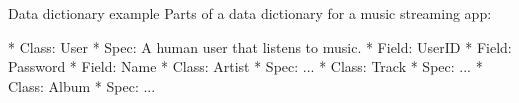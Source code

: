\begin{Slide}{Data dictionary example}
Parts of a data dictionary for a music streaming app:
\begin{Code}[language=]
* Class: User
  * Spec: A human user that listens to music.
  * Field: UserID
  * Field: Password
  * Field: Name
* Class: Artist 
  * Spec: ...
* Class: Track
  * Spec: ...
* Class: Album
  * Spec: ...
\end{Code}
\end{Slide}
